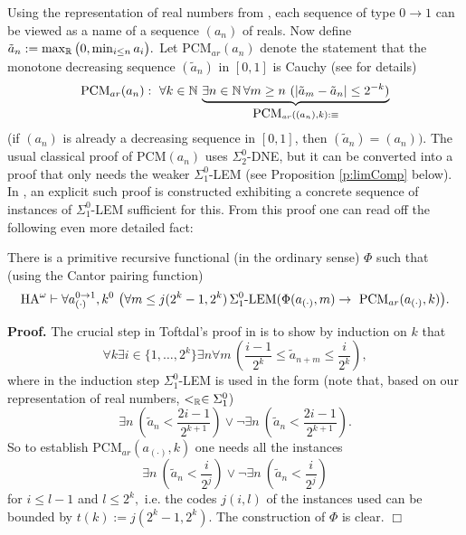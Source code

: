 Using the representation of real numbers from 
\cite{Kohlenbach08}, each sequence of type $0\to 1$ can be viewed 
as a name of a sequence $(a_n)$ of reals. Now define 
$\tilde{a}_n:=\max_{\mathbb{R}}\big(0,\min\nolimits_{i\le n}a_i\big).$ 
Let PCM$_{ar}(a_n)$ denote the statement that the monotone decreasing 
sequence $(\tilde{a}_n)$ in $[0,1]$ is Cauchy (see \cite{Kohlenbach08} 
for details) 
\[\mbox{PCM}_{ar}(a_n): \ \forall k\in\NN\,\underbrace{\exists n\in\NN\, 
\forall m\ge n\ (|\tilde{a}_m- \tilde{a}_n|\le 
2^{-k})}_{\mbox{PCM}_{ar}((a_n),k)
:\equiv} \]
(if $(a_n)$ is already 
a decreasing sequence in $[0,1]$, then $(\tilde{a}_n)=(a_n)).$ 
The usual classical proof of PCM$(a_n)$ uses $\Sigma^0_2$-DNE, but it can be 
converted into a proof that only needs the weaker $\Sigma^0_1$-LEM (see 
Proposition \ref{p:limComp} below). 
In \cite{Toftdal}, an explicit such proof is constructed 
exhibiting a concrete sequence of instances of $\Sigma^0_1$-LEM sufficient 
for this. From this proof one can read off the following even more detailed 
fact:
\begin{prop} There is a primitive recursive functional (in the 
ordinary sense) $\Phi$ such that (using the Cantor pairing function)
\[ \mbox{\rm HA}^{\omega}\vdash \forall a^{0\to 1}_{(\cdot)}, k^0\ 
\big( \forall m \le j(2^k-1,2^k) \,\Sigma^0_1\mbox{\rm -LEM}(\Phi(a_{(\cdot)},m)
\rightarrow 
\ \mbox{\rm PCM}_{ar}(a_{(\cdot)},k)\big). \] 
\end{prop} 
{\bf Proof.} The crucial step in Toftdal's proof in \cite{Toftdal} is 
to show by induction on $k$ that 
\[ \forall k\exists i\in \{ 1,\ldots,2^k\} \exists n \forall m \, 
\left( \frac{i-1}{2^k}\le \tilde{a}_{n+m}\le \frac{i}{2^k}\right), \]
where in the induction step $\Sigma^0_1$-LEM is used in the form 
(note that, based on our representation of real numbers, $<_{\mathbb{R}}\in\Sigma^0_1$) 
\[\exists n\ \left( \tilde{a}_n <\frac{2i-1}{2^{k+1}}\right) \vee 
\neg \exists n\ \left( \tilde{a}_n <\frac{2i-1}{2^{k+1}}\right). \]
So to establish PCM$_{ar}(a_{(\cdot)},k)$ one needs all the instances 
\[\exists n\ \left( \tilde{a}_n <\frac{i}{2^{j}}\right) \vee 
\neg \exists n\ \left( \tilde{a}_n <\frac{i}{2^{j}}\right) \] 
for $i\le l-1$ and $l\le 2^k,$ i.e. the codes $j(i,l)$ of the instances 
used can be bounded by $t(k):=j(2^k-1,2^k).$  The construction of $\Phi$ is 
clear. 
 \hfill $\Box$ 

\mbox{ } 

